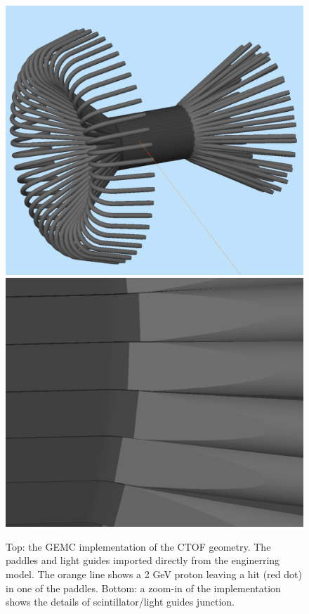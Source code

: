 \begin{figure}
	\centering
	\includegraphics[width=0.95\columnwidth,keepaspectratio]{img/ctofGeometry.png}
	\includegraphics[width=0.95\columnwidth,keepaspectratio]{img/ctofDetail.png}
	\caption{Top: the GEMC implementation of the CTOF geometry. The paddles and light guides imported directly from the enginerring model.
			   The orange line shows a 2 GeV proton leaving a hit (red dot) in one of the paddles.
				Bottom: a zoom-in of the implementation shows the details of scintillator/light guides junction. }
	\label{fig:ctofGeometry}
\end{figure}


